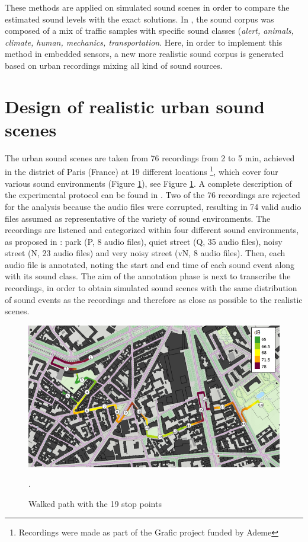 \documentclass[review,5p,twocolumn,sort&compress,times]{elsarticle}
\begin{document}
These methods are applied on simulated sound scenes in order to compare the estimated sound levels with the exact solutions. In \cite{}, the sound corpus was composed of a mix of traffic samples with specific sound classes (\textit{alert, animals, climate, human, mechanics, transportation}. Here, in order to implement this method in embedded sensors, a new more realistic sound corpus is generated based on urban recordings mixing all kind of sound sources.

\section{Design of realistic urban sound scenes}\label{part:urban_scene}

The urban sound scenes are taken from 76 recordings from 2 to 5 min, achieved in the  district of Paris (France) at 19 different locations \footnote{Recordings were made as part of the Grafic project funded by Ademe}, which cover four various sound environments (Figure \ref{fig:map_grafic}), see Figure \ref{fig:map_grafic}. A complete description of the experimental protocol can be found in \cite{aumond_modelling_2017}. Two of the 76 recordings are rejected for the analysis because the audio files were corrupted, resulting in 74 valid audio files assumed as representative of the variety of sound environments. The recordings are listened and categorized within four different sound environments, as proposed in \cite{can_describing_2015}: park (P, 8 audio files), quiet street (Q, 35 audio files), noisy street (N, 23 audio files) and very noisy street (vN, 8 audio files). Then, each audio file is annotated, noting the start and end time of each sound event along with its sound class. The aim of the annotation phase is next to transcribe the recordings, in order to obtain simulated sound scenes with the same distribution of sound events as the recordings and therefore as close as possible to the realistic scenes. 

\begin{figure}[t]
\centering
\includegraphics[width=\linewidth]{./figures/trajet_19pts.png}
\caption{Walked path with the 19 stop points  \cite{aumond_modelling_2017}}.
\label{fig:map_grafic}
\end{figure}
\end{document}
